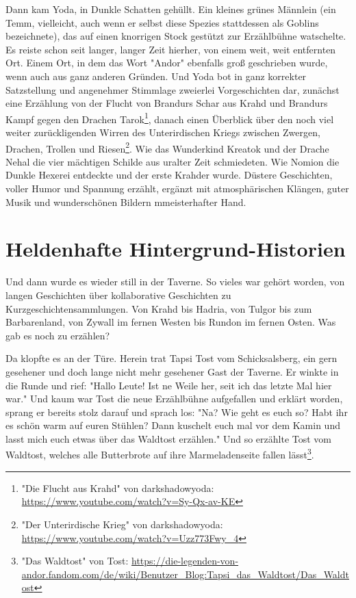 Dann kam Yoda, in Dunkle Schatten gehüllt. Ein kleines grünes Männlein (ein Temm, vielleicht, auch wenn er selbst diese Spezies stattdessen als Goblins bezeichnete), das auf einen knorrigen Stock gestützt zur Erzählbühne watschelte. Es reiste schon seit langer, langer Zeit hierher, von einem weit, weit entfernten Ort. Einem Ort, in dem das Wort "Andor" ebenfalls groß geschrieben wurde, wenn auch aus ganz anderen Gründen. Und Yoda bot in ganz korrekter Satzstellung und angenehmer Stimmlage zweierlei Vorgeschichten dar, zunächst eine Erzählung von der Flucht von Brandurs Schar aus Krahd und Brandurs Kampf gegen den Drachen Tarok\footnote{"Die Flucht aus Krahd" von darkshadowyoda: \url{https://www.youtube.com/watch?v=Sy-Qx-av-KE}}, danach einen Überblick über den noch viel weiter zurückligenden Wirren des Unterirdischen Kriegs zwischen Zwergen, Drachen, Trollen und Riesen\footnote{"Der Unterirdische Krieg" von darkshadowyoda: \url{https://www.youtube.com/watch?v=Uzz773Fwy_4}}. Wie das Wunderkind Kreatok und der Drache Nehal die vier mächtigen Schilde aus uralter Zeit schmiedeten. Wie Nomion die Dunkle Hexerei entdeckte und der erste Krahder wurde. Düstere Geschichten, voller Humor und Spannung erzählt, ergänzt mit atmosphärischen Klängen, guter Musik und wunderschönen Bildern mmeisterhafter Hand.




\section{Heldenhafte Hintergrund-Historien}


Und dann wurde es wieder still in der Taverne. So vieles war gehört worden, von langen Geschichten über kollaborative Geschichten zu Kurzgeschichtensammlungen. Von Krahd bis Hadria, von Tulgor bis zum Barbarenland, von Zywall im fernen Westen bis Rundon im fernen Osten. Was gab es noch zu erzählen?

Da klopfte es an der Türe. Herein trat Tapsi Tost vom Schicksalsberg, ein gern gesehener und doch lange nicht mehr gesehener Gast der Taverne. Er winkte in die Runde und rief: "Hallo Leute! Ist ne Weile her, seit ich das letzte Mal hier war." 
Und kaum war Tost die neue Erzählbühne aufgefallen und erklärt worden, sprang er bereits stolz darauf und sprach los: "Na? Wie geht es euch so? Habt ihr es schön warm auf euren Stühlen? Dann kuschelt euch mal vor dem Kamin und lasst mich euch etwas über das Waldtost erzählen."
Und so erzählte Tost vom Waldtost, welches alle Butterbrote auf ihre Marmeladenseite fallen lässt\footnote{"Das Waldtost" von Tost: \url{https://die-legenden-von-andor.fandom.com/de/wiki/Benutzer_Blog:Tapsi_das_Waldtost/Das_Waldtost}}. 

